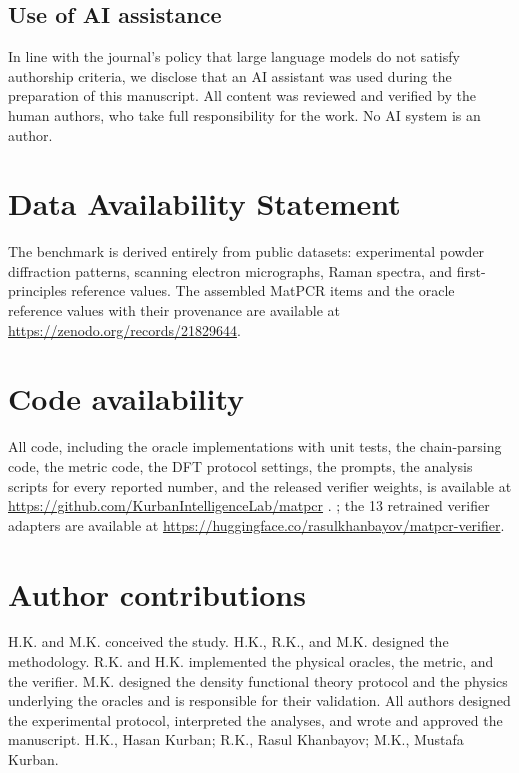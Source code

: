 \documentclass[pdflatex,sn-nature]{sn-jnl}
\newcommand{\rev}[1]{#1} %
\newcommand{\rev}[1]{{\color{blue}#1}} %
\providecommand{\DIFadd}[1]{{\protect\color{blue} \sf #1}} %
\providecommand{\DIFdel}[1]{{\protect\color{red} \scriptsize #1}} %
\providecommand{\DIFaddbegin}{} %
\providecommand{\DIFaddend}{} %
\providecommand{\DIFdelbegin}{} %
\providecommand{\DIFdelend}{} %
\providecommand{\DIFscaledelfig}{0.5}
\newlength{\DIFdelgraphicswidth} %
\newlength{\DIFdelgraphicsheight} %
\providecommand{\DIFaddincludegraphics}[2][]{{\color{blue}\fbox{\DIFOincludegraphics[#1]{#2}}}} %
\providecommand{\DIFdelincludegraphics}[2][]{%
\sbox{\DIFdelgraphicsbox}{\DIFOincludegraphics[#1]{#2}}%
\settoboxwidth{\DIFdelgraphicswidth}{\DIFdelgraphicsbox} %
\settoboxtotalheight{\DIFdelgraphicsheight}{\DIFdelgraphicsbox} %
\scalebox{\DIFscaledelfig}{%
\parbox[b]{\DIFdelgraphicswidth}{\usebox{\DIFdelgraphicsbox}\\[-\baselineskip] \rule{\DIFdelgraphicswidth}{0em}}\llap{\resizebox{\DIFdelgraphicswidth}{\DIFdelgraphicsheight}{%
\setlength{\unitlength}{\DIFdelgraphicswidth}%
\begin{picture}(1,1)%
\thicklines\linethickness{2pt} %
{\color[rgb]{1,0,0}\put(0,0){\framebox(1,1){}}}%
{\color[rgb]{1,0,0}\put(0,0){\line( 1,1){1}}}%
{\color[rgb]{1,0,0}\put(0,1){\line(1,-1){1}}}%
\end{picture}%
}\hspace*{3pt}}} %
} %
\DeclareRobustCommand{\DIFaddbegin}{\DIFOaddbegin \let\includegraphics\DIFaddincludegraphics} %
\DeclareRobustCommand{\DIFaddend}{\DIFOaddend \let\includegraphics\DIFOincludegraphics} %
\DeclareRobustCommand{\DIFdelbegin}{\DIFOdelbegin \let\includegraphics\DIFdelincludegraphics} %
\DeclareRobustCommand{\DIFdelend}{\DIFOaddend \let\includegraphics\DIFOincludegraphics} %
\begin{document}
\subsection*{Use of AI assistance}
In line with the journal's policy that large language models do not satisfy
authorship criteria, we disclose that an AI assistant was used during the preparation of
this manuscript. All content was reviewed and verified by the human authors, who take
full responsibility for the work. No AI system is an author.

\section*{Data Availability Statement}
The benchmark is derived entirely from public datasets: experimental powder diffraction
patterns,\cite{opxrd2025} scanning electron micrographs,\cite{aversa2018nffa} Raman
spectra,\cite{lafuente2015rruff} and first-principles reference values.\cite{matproj2013} The assembled MatPCR items and the oracle
reference values with their provenance are available at \url{https://zenodo.org/records/21829644}.

\section*{Code availability}
All code, including the oracle implementations with unit tests, the chain-parsing
code, the metric code, the DFT protocol settings, the prompts, \DIFaddbegin \DIFadd{\rev{the analysis scripts for every
reported number,} }\DIFaddend and the released
verifier weights, is available at \url{https://github.com/KurbanIntelligenceLab/matpcr}\DIFdelbegin \DIFdel{.
}\DIFdelend \DIFaddbegin \DIFadd{\rev{; the
13 retrained verifier adapters are available at \url{https://huggingface.co/rasulkhanbayov/matpcr-verifier}.}
}\DIFaddend 

\section*{Author contributions}
H.K. and M.K. conceived the study. H.K., R.K., and M.K. designed the methodology.
R.K. and H.K. implemented the physical oracles, the metric, and the verifier. M.K.
designed the density functional theory protocol and the physics underlying the oracles
and is responsible for their validation. All authors designed the experimental protocol,
interpreted the analyses, and wrote and approved the manuscript. H.K., Hasan Kurban; R.K., Rasul
Khanbayov; M.K., Mustafa Kurban.
\end{document}
